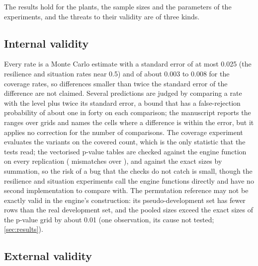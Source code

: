 The results hold for the plants, the sample sizes and the parameters of the experiments, and the threats to their validity are of three kinds.

\subsection{Internal validity}

Every rate is a Monte Carlo estimate with a standard error of at most 0.025 (the resilience and situation rates near 0.5) and of about 0.003 to 0.008 for the coverage rates, so differences smaller than twice the standard error of the difference are not claimed. Several predictions are judged by comparing a rate with the level plus twice its standard error, a bound that has a false-rejection probability of about one in forty on each comparison; the manuscript reports the ranges over grids and names the cells where a difference is within the error, but it applies no correction for the number of comparisons. The coverage experiment evaluates the variants on the covered count, which is the only statistic that the tests read; the vectorised p-value tables are checked against the engine function on every replication (\CovEngineMismatches{} mismatches over \CovTotalReps{}), and against the exact sizes by summation, so the risk of a bug that the checks do not catch is small, though the resilience and situation experiments call the engine functions directly and have no second implementation to compare with. The permutation reference may not be exactly valid in the engine's construction: its pseudo-development set has fewer rows than the real development set, and the pooled sizes exceed the exact sizes of the p-value grid by about 0.01 (one observation, its cause not tested; \cref{sec:results}).

\subsection{External validity}

